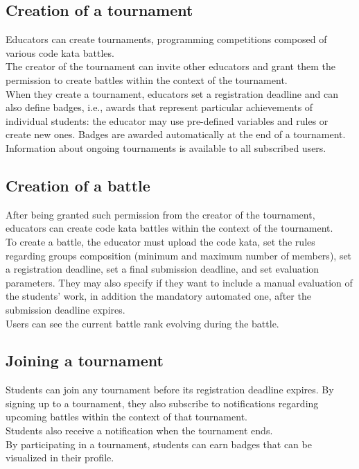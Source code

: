 \subsection{Creation of a tournament}
Educators can create tournaments, programming competitions composed of various code kata battles.\\
The creator of the tournament can invite other educators and grant them the permission to create battles within the 
context of the tournament.\\
When they create a tournament, educators set a registration deadline and can also define badges, i.e., awards that 
represent particular achievements of individual students: the educator may use pre-defined variables and rules or create 
new ones. Badges are awarded automatically at the end of a tournament.\\
Information about ongoing tournaments is available to all subscribed users.\\

\subsection{Creation of a battle}
After being granted such permission from the creator of the tournament, educators can create code kata battles within the
context of the tournament.\\
To create a battle, the educator must upload the code kata, set the rules regarding groups composition (minimum and maximum 
number of members), set a registration deadline, set a final submission deadline, and set evaluation parameters. They may also 
specify if they want to include a manual evaluation of the students' work, in addition the mandatory automated one, after the 
submission deadline expires.\\
Users can see the current battle rank evolving during the battle.\\

\subsection{Joining a tournament}
Students can join any tournament before its registration deadline expires. By signing up to a tournament, they also 
subscribe to notifications regarding upcoming battles within the context of that tournament.\\
Students also receive a notification when the tournament ends.\\
By participating in a tournament, students can earn badges that can be visualized in their profile.\\

